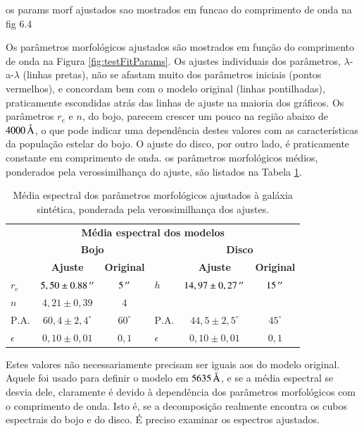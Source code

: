 os params morf ajustados sao mostrados em funcao do comprimento de onda  na fig
6.4

Os parâmetros morfológicos ajustados são mostrados em função do comprimento de
onda na Figura \ref{fig:testFitParams}. Os ajustes individuais dos parâmetros,
$\lambda$-a-$\lambda$ (linhas pretas), não se afastam muito dos parâmetros
iniciais (pontos vermelhos), e concordam bem com o modelo original (linhas
pontilhadas), praticamente escondidas atrás das linhas de ajuste na maioria dos
gráficos. Os parâmetros $r_e$ e $n$, do bojo, parecem crescer um pouco na região
abaixo de $4000\,\text{\normalfont\AA}$, o que pode indicar uma dependência destes valores
com as características da população estelar do bojo. O ajuste do disco, por
outro lado, é praticamente constante em comprimento de onda.
os parâmetros morfológicos médios, ponderados pela verossimilhança do ajuste,
são listados na Tabela \ref{tab:testeModeloAjuste}.

\begin{table}
\begin{tabular}{ l c c l c c }
  \hline
  \multicolumn{6}{c}{\textbf{Média espectral dos modelos}} \\
  & \multicolumn{2}{c}{\textbf{Bojo}} & & \multicolumn{2}{c}{\textbf{Disco}} \\
  & \textbf{Ajuste} & \textbf{Original} & & \textbf{Ajuste} & \textbf{Original} \\
  \hline
  $r_e$ & $5,50 \pm 0.88\,^{\prime\prime}$ & $5\,^{\prime\prime}$ & $h$ & $14,97 \pm
  0,27\,^{\prime\prime}$ & $15\,^{\prime\prime}$ \\
  $n$ & $4,21 \pm 0,39$ & $4$ & & & \\
  $\mathrm{P.A.}$ & $60,4 \pm 2,4^\circ$ & $60^\circ$ & $\mathrm{P.A.}$ &
  $44,5 \pm 2,5^\circ$ & $45^\circ$ \\
  $\epsilon$ & $0,10 \pm 0,01$ & $0,1$ & $\epsilon$ & $0,10 \pm 0,01$ &
  $0,1$ \\
  \hline
\end{tabular}
\caption[Ajuste morfológico espectral -- média dos parâmetros]
{Média espectral dos parâmetros morfológicos ajustados à galáxia sintética,
ponderada pela verossimilhança dos ajustes.}
\label{tab:testeModeloAjuste}
\end{table}

Estes valores não necessariamente precisam ser iguais aos do modelo original.
Aquele foi usado para definir o modelo em $5635\,\text{\normalfont\AA}$, e se a média
espectral se desvia dele, claramente é devido à dependência dos parâmetros
morfológicos com o comprimento de onda. Isto é, se a decomposição realmente
encontra os cubos espectrais do bojo e do disco. É preciso examinar os espectros
ajustados.


